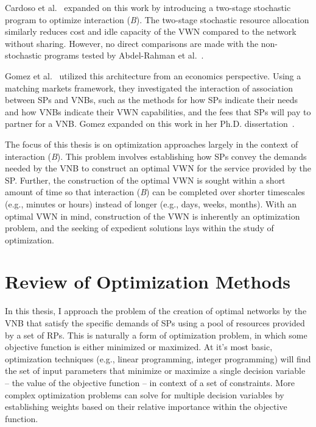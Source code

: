 \documentclass[12pt,dvipsnames]{report}
\begin{document}
Cardoso et al.~\cite{MJ_MECOMM_17} expanded on this work by introducing a two-stage stochastic program to optimize interaction (\emph{B}).  The two-stage stochastic resource allocation similarly reduces cost and idle capacity of the VWN compared to the network without sharing.  However, no direct comparisons are made with the non-stochastic programs tested by Abdel-Rahman et al.~\cite{MJ_CCNC_16}.

Gomez et al.~\cite{pittir33631} utilized this architecture from an economics perspective.  Using a matching markets framework, they investigated the interaction of association between SPs and VNBs, such as the methods for how SPs indicate their needs and how VNBs indicate their VWN capabilities, and the fees that SPs will pay to partner for a VNB.  Gomez expanded on this work in her Ph.D. dissertation~\cite{pittir33130}.%

The focus of this thesis is on optimization approaches largely in the context of interaction (\emph{B}).  This problem involves establishing how SPs convey the demands needed by the VNB to construct an optimal VWN for the service provided by the SP.  Further, the construction of the optimal VWN is sought within a short amount of time so that interaction (\emph{B}) can be completed over shorter timescales (e.g., minutes or hours) instead of longer (e.g., days, weeks, months).  With an optimal VWN in mind, construction of the VWN is inherently an optimization problem, and the seeking of expedient solutions lays within the study of optimization.

\section{Review of Optimization Methods} \label{sec:optreview}

In this thesis, I approach the problem of the creation of optimal networks by the VNB that satisfy the specific demands of SPs using a pool of resources provided by a set of RPs.  This is naturally a form of optimization problem, in which some objective function is either minimized or maximized.  At it's most basic, optimization techniques (e.g., linear programming, integer programming) will find the set of input parameters that minimize or maximize a single decision variable -- the value of the objective function -- in context of a set of constraints.  More complex optimization problems can solve for multiple decision variables by establishing weights based on their relative importance within the objective function.
\end{document}
